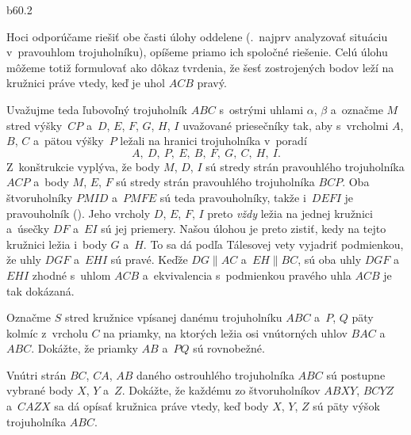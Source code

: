{%
\epsplace b60.2 \hfil\Obr\par
Hoci odporúčame riešiť obe časti úlohy oddelene (\tj.~najprv analyzovať
situáciu v~pravouhlom trojuholníku), opíšeme priamo ich spoločné riešenie. Celú
úlohu môžeme totiž formulovať ako dôkaz tvrdenia,
že šesť zostrojených bodov leží na kružnici práve vtedy, keď je uhol $ACB$ pravý.

Uvažujme teda ľubovoľný trojuholník $ABC$ s~ostrými uhlami $\alpha$, $\beta$ a~označme $M$
stred výšky~$CP$ a~$D$, $E$, $F$, $G$, $H$, $I$ uvažované
priesečníky tak, aby s~vrcholmi $A$, $B$, $C$ a~pätou výšky~$P$
ležali na hranici trojuholníka v~poradí
$$
A,\ D,\ P,\ E,\ B,\ F,\ G,\ C,\ H,\ I.
$$
Z~konštrukcie vyplýva, že body $M$, $D$, $I$ sú stredy strán
pravouhlého trojuholníka $ACP$ a~body $M$, $E$, $F$ sú stredy strán
pravouhlého trojuholníka $BCP$. Oba štvoruholníky $PMID$ a~$PMFE$ sú
teda pravouholníky, takže i~$DEFI$ je pravouholník (\obr). Jeho vrcholy
$D$, $E$, $F$, $I$ preto {\it vždy\/} ležia na jednej kružnici
a~úsečky $DF$ a~$EI$ sú jej priemery. Našou úlohou je preto
zistiť, kedy na tejto kružnici ležia i~body $G$ a~$H$. To sa dá podľa
Tálesovej vety vyjadriť podmienkou, že uhly $DGF$ a~$EHI$ sú
pravé. Keďže ${DG\parallel AC}$ a~$EH\parallel BC$, sú oba uhly
$DGF$ a~$EHI$ zhodné s~uhlom $ACB$ a~ekvivalencia s~podmienkou
pravého uhla $ACB$ je tak dokázaná.
\inspicture

Označme $S$ stred kružnice vpísanej danému trojuholníku $ABC$ a~$P$, $Q$
päty kolmíc z~vrcholu $C$ na priamky,
na ktorých ležia osi vnútorných uhlov $BAC$ a~$ABC$. Dokážte, že priamky $AB$
a~$PQ$ sú rovnobežné.
\vpravo{[51--A--S--2]}

Vnútri strán $BC$, $CA$, $AB$ daného ostrouhlého trojuholníka $ABC$ sú
postupne vybrané
body $X$, $Y$ a~$Z$. Dokážte, že každému zo štvoruholníkov $ABXY$, $BCYZ$
a~$CAZX$ sa dá opísať kružnica práve vtedy, keď
body $X$, $Y$, $Z$ sú päty výšok trojuholníka $ABC$.
\vpravo{[51--B--S--2]}
}

